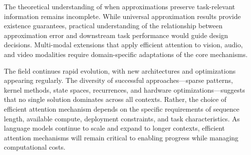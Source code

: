 The theoretical understanding of when approximations preserve task-relevant information remains incomplete. While universal approximation results provide existence guarantees, practical understanding of the relationship between approximation error and downstream task performance would guide design decisions. Multi-modal extensions that apply efficient attention to vision, audio, and video modalities require domain-specific adaptations of the core mechanisms.

The field continues rapid evolution, with new architectures and optimizations appearing regularly. The diversity of successful approaches—sparse patterns, kernel methods, state spaces, recurrences, and hardware optimizations—suggests that no single solution dominates across all contexts. Rather, the choice of efficient attention mechanism depends on the specific requirements of sequence length, available compute, deployment constraints, and task characteristics. As language models continue to scale and expand to longer contexts, efficient attention mechanisms will remain critical to enabling progress while managing computational costs.
